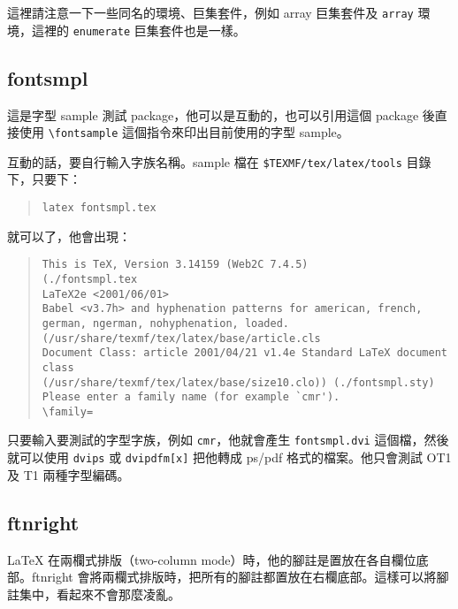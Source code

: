 這裡請注意一下一些同名的環境、巨集套件，例如 \textsf{array} 巨集套件及 \texttt{array} 環境，這裡的 \texttt{enumerate} 巨集套件也是一樣。

\subsection{fontsmpl}

這是字型 sample 測試 package，他可以是互動的，也可以引用這個 package 後直接使用 \verb|\fontsample| 這個指令來印出目前使用的字型 sample。

互動的話，要自行輸入字族名稱。sample 檔在 \texttt{\$TEXMF/tex/latex/tools} 目錄下，只要下：

\begin{quote}
  \begin{verbatim}
latex fontsmpl.tex
\end{verbatim}
\end{quote}

就可以了，他會出現：

\begin{quote}
  \begin{verbatim}
This is TeX, Version 3.14159 (Web2C 7.4.5)
(./fontsmpl.tex
LaTeX2e <2001/06/01>
Babel <v3.7h> and hyphenation patterns for american, french,
german, ngerman, nohyphenation, loaded.
(/usr/share/texmf/tex/latex/base/article.cls
Document Class: article 2001/04/21 v1.4e Standard LaTeX document class
(/usr/share/texmf/tex/latex/base/size10.clo)) (./fontsmpl.sty)
Please enter a family name (for example `cmr').
\family=
\end{verbatim}
\end{quote}

只要輸入要測試的字型字族，例如 \texttt{cmr}，他就會產生 \texttt{fontsmpl.dvi} 這個檔，然後就可以使用 \texttt{dvips} 或 \texttt{dvipdfm[x]} 把他轉成 ps/pdf 格式的檔案。他只會測試 OT1 及 T1 兩種字型編碼。

\subsection{ftnright}

\LaTeX{} 在兩欄式排版（two-column mode）時，他的腳註是置放在各自欄位底部。\textsf{ftnright} 會將兩欄式排版時，把所有的腳註都置放在右欄底部。這樣可以將腳註集中，看起來不會那麼凌亂。

